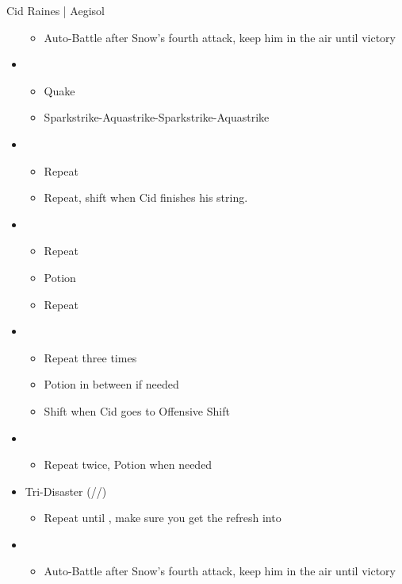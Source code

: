 \begin{battle}[1:40]{Cid Raines | Aegisol}
\begin{multicols}{2}
\begin{itemize}
\begin{itemize}
				      \item Auto-Battle after Snow's fourth attack, keep him in the air until victory
			      \end{itemize}
		\columnbreak
	\renewcommand{\fourth}{[4] Tri-Disaster (\rav/\rav/\rav)}
			\item \first
			      \begin{itemize}
				      \item Quake
				      \item Sparkstrike-Aquastrike-Sparkstrike-Aquastrike
			      \end{itemize}
			\item \third
			      \begin{itemize}
				      \item Repeat
				      \item Repeat, shift when Cid finishes his string.
			      \end{itemize}
			\item \fifth
			      \begin{itemize}
				      \item Repeat
				      \item Potion
				      \item Repeat
			      \end{itemize}
			\item \second
			      \begin{itemize}
				      \item Repeat three times
				      \item Potion in between if needed
				      \item Shift when Cid goes to Offensive Shift
			      \end{itemize}
			\item \third
			      \begin{itemize}
				      \item Repeat twice, Potion when needed
			      \end{itemize}
			\item \fourth
				\begin{itemize}
					\item Repeat until \stagger, make sure you get the refresh into
				\end{itemize}
			\item \sixth
			      \begin{itemize}
				      \item Auto-Battle after Snow's fourth attack, keep him in the air until victory
			      \end{itemize}
		\end{itemize}
		\end{multicols}
	\end{battle}
